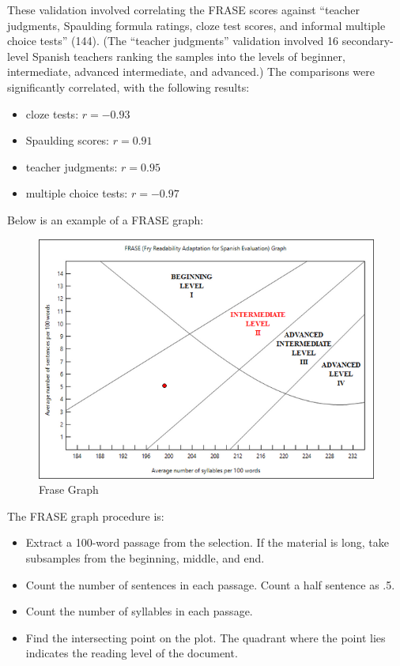 \documentclass[
]{book}
\providecommand{\tightlist}{%
  \setlength{\itemsep}{0pt}\setlength{\parskip}{0pt}}
\theoremstyle{definition}
\theoremstyle{definition}
\theoremstyle{definition}
\theoremstyle{definition}
\theoremstyle{remark}
\begin{document}
These validation involved correlating the FRASE scores against ``teacher judgments, Spaulding formula ratings, cloze test scores, and informal multiple choice tests'' (144). (The ``teacher judgments'' validation involved 16 secondary-level Spanish teachers ranking the samples into the levels of beginner, intermediate, advanced intermediate, and advanced.) The comparisons were significantly correlated, with the following results:

\begin{itemize}
\tightlist
\item
  cloze tests: \(r = -0.93\)
\item
  Spaulding scores: \(r = 0.91\)
\item
  teacher judgments: \(r = 0.95\)
\item
  multiple choice tests: \(r = -0.97\)
\end{itemize}

Below is an example of a FRASE graph:

\begin{figure}[H]

{\centering \includegraphics[width=0.75\linewidth,]{Images/FraseGraph} 

}

\caption{Frase Graph}\label{fig:frase}
\end{figure}

The FRASE graph procedure is:

\begin{itemize}
\tightlist
\item
  Extract a 100-word passage from the selection. If the material is long, take subsamples from the beginning, middle, and end.
\item
  Count the number of sentences in each passage. Count a half sentence as .5.
\item
  Count the number of syllables in each passage.
\item
  Find the intersecting point on the plot. The quadrant where the point lies indicates the reading level of the document.
\end{itemize}
\end{document}
